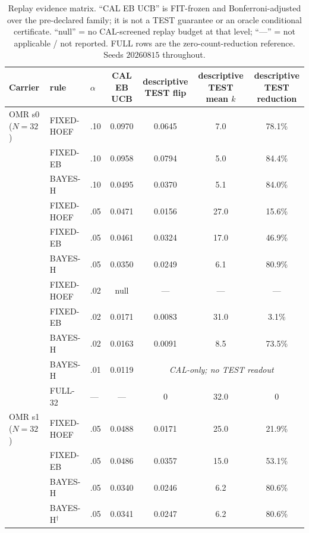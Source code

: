 \documentclass{article}
\theoremstyle{definition}
\theoremstyle{remark}
\begin{document}
\begin{table}[h]
\centering\footnotesize\setlength{\tabcolsep}{2pt}
\caption{Replay evidence matrix. ``CAL EB UCB'' is FIT-frozen and
Bonferroni-adjusted over the pre-declared family; it is not a TEST guarantee or
an oracle conditional certificate. ``null'' = no CAL-screened replay budget at
that level; ``---'' = not applicable / not reported. FULL rows are the
zero-count-reduction reference. Seeds $20260815$ throughout.}
\label{tab:matrix}
\begin{tabular}{lllcccc}
\toprule
Carrier & rule & $\alpha$ & CAL EB UCB & \shortstack{descriptive\\TEST flip} & \shortstack{descriptive\\TEST mean $k$} & \shortstack{descriptive\\TEST reduction} \\
\midrule
OMR s0 ($N{=}32$)   & FIXED-HOEF & .10 & 0.0970 & 0.0645 & 7.0 & 78.1\% \\
                    & FIXED-EB   & .10 & 0.0958 & 0.0794 & 5.0 & 84.4\% \\
                    & BAYES-H    & .10 & 0.0495 & 0.0370 & 5.1 & 84.0\% \\
                    & FIXED-HOEF & .05 & 0.0471 & 0.0156 & 27.0 & 15.6\% \\
                    & FIXED-EB   & .05 & 0.0461 & 0.0324 & 17.0 & 46.9\% \\
                    & BAYES-H    & .05 & 0.0350 & 0.0249 & 6.1 & 80.9\% \\
                    & FIXED-HOEF & .02 & null & --- & --- & --- \\
                    & FIXED-EB   & .02 & 0.0171 & 0.0083 & 31.0 & 3.1\% \\
                    & BAYES-H    & .02 & 0.0163 & 0.0091 & 8.5 & 73.5\% \\
                    & BAYES-H    & .01 & 0.0119 & \multicolumn{3}{c}{\emph{CAL-only; no TEST readout}} \\
                    & FULL-32    & --- & --- & 0 & 32.0 & 0 \\
\midrule
OMR s1 ($N{=}32$)   & FIXED-HOEF & .05 & 0.0488 & 0.0171 & 25.0 & 21.9\% \\
                    & FIXED-EB   & .05 & 0.0486 & 0.0357 & 15.0 & 53.1\% \\
                    & BAYES-H    & .05 & 0.0340 & 0.0246 & 6.2 & 80.6\% \\
                    & BAYES-H$^\dagger$ & .05 & 0.0341 & 0.0247 & 6.2 & 80.6\% \\

\end{tabular}
\end{table}
\end{document}
